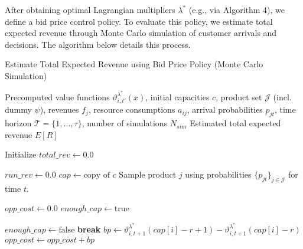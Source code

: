 \documentclass[11pt]{article}
\begin{document}
\noindent
After obtaining optimal Lagrangian multipliers $\lambda^*$ (e.g., via Algorithm 4), we define a bid price control policy. To evaluate this policy, we estimate total expected revenue through Monte Carlo simulation of customer arrivals and decisions. The algorithm below details this process.

\vspace{0.5cm}

\begin{algorithm}[H]
\caption{Estimate Total Expected Revenue using Bid Price Policy (Monte Carlo Simulation)}
\label{alg:monte_carlo_revenue}
\begin{algorithmic}[1]
\Require Precomputed value functions $\vartheta^{\lambda^*}_{i,t'}(x)$, initial capacities $c$, product set $\mathcal{J}$ (incl. dummy $\psi$), revenues $f_j$, resource consumptions $a_{ij}$, arrival probabilities $p_{jt}$, time horizon $\mathcal{T} = \{1, \ldots, \tau\}$, number of simulations $N_{sim}$
\Ensure Estimated total expected revenue $E[R]$

\State Initialize $total\_rev \gets 0.0$

 
    \State $run\_rev \gets 0.0$
    \State $cap \gets \text{copy of } c$ 
     
        \State Sample product $j$ using probabilities $\{p_{jt}\}_{j \in \mathcal{J}}$ for time $t$.
        
         
            \State $opp\_cost \gets 0.0$
            \State $enough\_cap \gets \text{true}$
            
             
                    \State $enough\_cap \gets \text{false}$
                    \State \textbf{break} 
                \EndIf
                 
                    \State $bp \gets \vartheta^{\lambda^*}_{i,t+1}(cap[i] - r + 1) - \vartheta^{\lambda^*}_{i,t+1}(cap[i] - r)$
                    \State $opp\_cost \gets opp\_cost + bp$
                \EndFor
            \EndFor
            

\end{algorithmic}
\end{algorithm}
\end{document}
